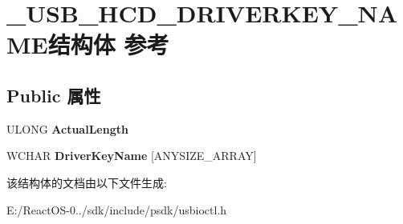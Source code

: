 \hypertarget{struct___u_s_b___h_c_d___d_r_i_v_e_r_k_e_y___n_a_m_e}{}\section{\+\_\+\+U\+S\+B\+\_\+\+H\+C\+D\+\_\+\+D\+R\+I\+V\+E\+R\+K\+E\+Y\+\_\+\+N\+A\+M\+E结构体 参考}
\label{struct___u_s_b___h_c_d___d_r_i_v_e_r_k_e_y___n_a_m_e}
\subsection*{Public 属性}
\begin{DoxyCompactItemize}
\item 
\mbox{\label{struct___u_s_b___h_c_d___d_r_i_v_e_r_k_e_y___n_a_m_e_a839aa4673beeca9f88a163492e296527}} 
U\+L\+O\+NG {\bfseries Actual\+Length}
\item 
\mbox{\label{struct___u_s_b___h_c_d___d_r_i_v_e_r_k_e_y___n_a_m_e_a63bd3682f8d999eaba5004a9fa651975}} 
W\+C\+H\+AR {\bfseries Driver\+Key\+Name} \mbox{[}A\+N\+Y\+S\+I\+Z\+E\+\_\+\+A\+R\+R\+AY\mbox{]}
\end{DoxyCompactItemize}


该结构体的文档由以下文件生成\+:\begin{DoxyCompactItemize}
\item 
E\+:/\+React\+O\+S-\/0../sdk/include/psdk/usbioctl.\+h\end{DoxyCompactItemize}
